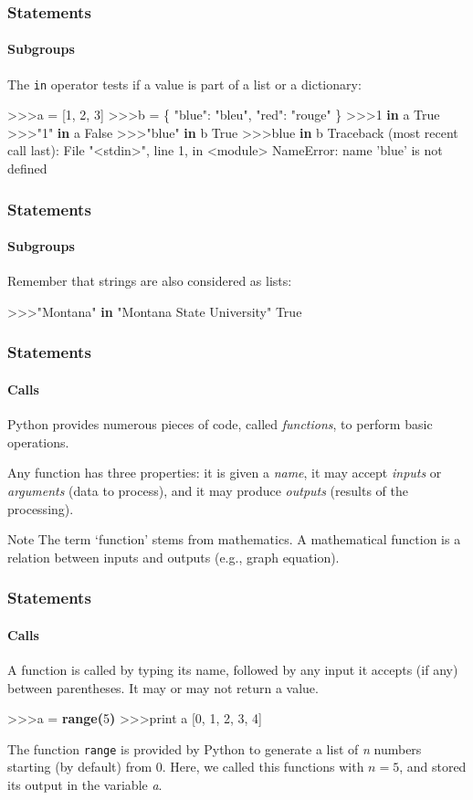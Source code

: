 \documentclass[handout]{beamer}
\def\prompt{>\hspace{-1pt}>\hspace{-1pt}>\/}
\begin{document}
\begin{frame}[fragile]
	\frametitle{Statements}
	\framesubtitle{Subgroups}

	The \texttt{in} operator tests if a value is part of a list or a dictionary:

	\begin{semiverbatim}
		\prompt a = [1, 2, 3]
		\prompt b = \{ "blue": "bleu", "red": "rouge" \}
		\prompt 1 \textbf{in} a
		True
		\prompt "1" \textbf{in} a
		False
		\prompt "blue" \textbf{in} b
		True
		\prompt blue \textbf{in} b
		Traceback (most recent call last):
		  File "<stdin>", line 1, in <module>
		NameError: name 'blue' is not defined
	\end{semiverbatim}
\end{frame}

\begin{frame}[fragile]
	\frametitle{Statements}
	\framesubtitle{Subgroups}

	Remember that strings are also considered as lists:

	\begin{semiverbatim}
		\prompt "Montana" \textbf{in} "Montana State University"
		True
	\end{semiverbatim}
\end{frame}

\begin{frame}
	\frametitle{Statements}
	\framesubtitle{Calls}

	Python provides numerous pieces of code, called \textit{functions}, to perform basic operations.

	\pause
	\medskip
	Any function has three properties: it is given a \textit{name}, it may accept \textit{inputs} or \textit{arguments} (data to process), and it may produce \textit{outputs} (results of the processing).

	\pause
	\medskip
	\begin{block}{Note}
		The term `function' stems from mathematics. A mathematical function is a relation between inputs and outputs (e.g., graph equation).
	\end{block}
\end{frame}

\begin{frame}[fragile]
	\frametitle{Statements}
	\framesubtitle{Calls}

	A function is called by typing its name, followed by any input it accepts (if any) between parentheses. It may or may not return a value.

	\begin{semiverbatim}
		\prompt a = \textbf{range(}5\textbf{)}
		\prompt print a
		[0, 1, 2, 3, 4]
	\end{semiverbatim}

	The function \texttt{range} is provided by Python to generate a list of \textit{n} numbers starting (by default) from 0. Here, we called this functions with $n = 5$, and stored its output in the variable \textit{a}.
\end{frame}
\end{document}
